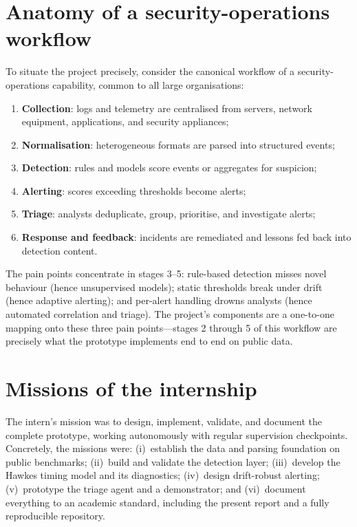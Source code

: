 \documentclass[11pt,a4paper]{report}
\begin{document}
\section{Anatomy of a security-operations workflow}
To situate the project precisely, consider the canonical workflow of a
security-operations capability, common to all large organisations:
\begin{enumerate}[nosep,leftmargin=1.6em]
  \item \textbf{Collection}: logs and telemetry are centralised from
  servers, network equipment, applications, and security appliances;
  \item \textbf{Normalisation}: heterogeneous formats are parsed into
  structured events;
  \item \textbf{Detection}: rules and models score events or aggregates
  for suspicion;
  \item \textbf{Alerting}: scores exceeding thresholds become alerts;
  \item \textbf{Triage}: analysts deduplicate, group, prioritise, and
  investigate alerts;
  \item \textbf{Response and feedback}: incidents are remediated and
  lessons fed back into detection content.
\end{enumerate}
The pain points concentrate in stages 3--5: rule-based detection misses
novel behaviour (hence unsupervised models); static thresholds break under
drift (hence adaptive alerting); and per-alert handling drowns analysts
(hence automated correlation and triage). The project's components are a
one-to-one mapping onto these three pain points---stages 2 through 5 of
this workflow are precisely what the prototype implements end to end on
public data.

\section{Missions of the internship}
The intern's mission was to design, implement, validate, and document the
complete prototype, working autonomously with regular supervision
checkpoints. Concretely, the missions were: (i)~establish the data and
parsing foundation on public benchmarks; (ii)~build and validate the
detection layer; (iii)~develop the Hawkes timing model and its diagnostics;
(iv)~design drift-robust alerting; (v)~prototype the triage agent and a
demonstrator; and (vi)~document everything to an academic standard,
including the present report and a fully reproducible repository.
\end{document}
